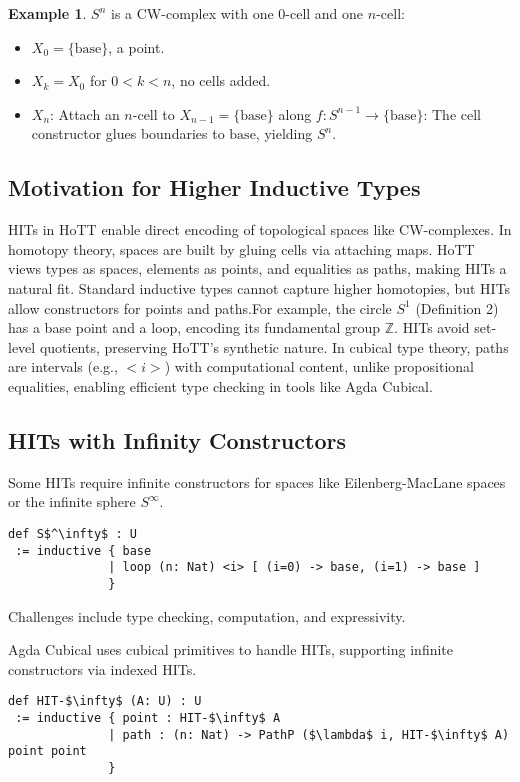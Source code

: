 \documentclass{article}
\theoremstyle{definition}
\newtheorem{example}{Example}
\begin{document}
\begin{example}
\( S^n \) is a CW-complex with one 0-cell and one \( n \)-cell:
\begin{itemize}
    \item \( X_0 = \{ \text{base} \} \), a point.
    \item \( X_k = X_0 \) for \( 0 < k < n \), no cells added.
    \item \( X_n \): Attach an \( n \)-cell to \( X_{n-1} =
      \{ \text{base} \} \) along \( f : S^{n-1} \to
      \{ \text{base} \} \):
    The \( \text{cell} \) constructor glues boundaries to
    \( \text{base} \), yielding \( S^n \).
\end{itemize}
\end{example}

\subsection{Motivation for Higher Inductive Types}
HITs in HoTT enable direct encoding of topological spaces like
CW-complexes. In homotopy theory, spaces are built by gluing
cells via attaching maps. HoTT views types as spaces, elements
as points, and equalities as paths, making HITs a natural fit.
Standard inductive types cannot capture higher homotopies, but
HITs allow constructors for points and paths.For example, the circle \( S^1 \) (Definition 2) has a base
point and a loop, encoding its fundamental group
\( \mathbb{Z} \). HITs avoid set-level quotients, preserving
HoTT’s synthetic nature. In cubical type theory, paths are
intervals (e.g., \( <i> \)) with computational content, unlike
propositional equalities, enabling efficient type checking in
tools like Agda Cubical.

\subsection{HITs with Infinity Constructors}
Some HITs require infinite constructors for spaces like Eilenberg-MacLane spaces or the infinite sphere $S^\infty$.
\begin{lstlisting}[mathescape=true]
def S$^\infty$ : U
 := inductive { base
              | loop (n: Nat) <i> [ (i=0) -> base, (i=1) -> base ]
              }
\end{lstlisting}
Challenges include type checking, computation, and expressivity.

Agda Cubical uses cubical primitives to handle HITs, supporting
infinite constructors via indexed HITs.

\begin{lstlisting}[mathescape=true]
def HIT-$\infty$ (A: U) : U
 := inductive { point : HIT-$\infty$ A
              | path : (n: Nat) -> PathP ($\lambda$ i, HIT-$\infty$ A) point point
              }
\end{lstlisting}
\end{document}
